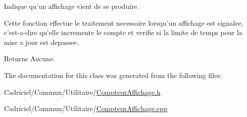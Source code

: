 Indique qu'un affichage vient de se produire. 

Cette fonction effectue le traitement necessaire lorsqu'un affichage est signalee, c'est-\/a-\/dire qu'elle incremente le compte et verifie si la limite de temps pour la mise a jour est depassee.

\begin{DoxyReturn}{Returns}
Aucune. 
\end{DoxyReturn}


The documentation for this class was generated from the following files\-:\begin{DoxyCompactItemize}
\item 
Cadriciel/\-Commun/\-Utilitaire/\hyperlink{_compteur_affichage_8h}{Compteur\-Affichage.\-h}\item 
Cadriciel/\-Commun/\-Utilitaire/\hyperlink{_compteur_affichage_8cpp}{Compteur\-Affichage.\-cpp}\end{DoxyCompactItemize}
